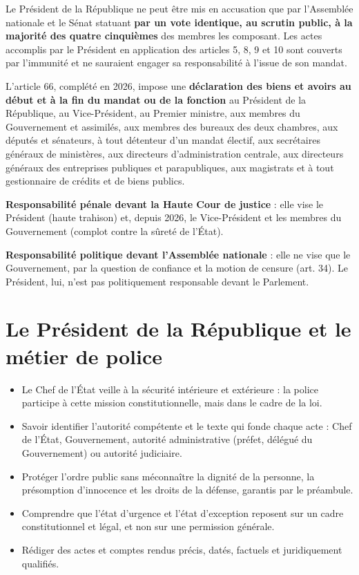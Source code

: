 \documentclass[11pt,a4paper,oneside]{report}
\begin{document}
Le Président de la République ne peut être mis en accusation que par l'Assemblée nationale et le Sénat statuant \textbf{par un vote identique, au scrutin public, à la majorité des quatre cinquièmes} des membres les composant. Les actes accomplis par le Président en application des articles 5, 8, 9 et 10 sont couverts par l'immunité et ne sauraient engager sa responsabilité à l'issue de son mandat.

L'article 66, complété en 2026, impose une \textbf{déclaration des biens et avoirs au début et à la fin du mandat ou de la fonction} au Président de la République, au Vice-Président, au Premier ministre, aux membres du Gouvernement et assimilés, aux membres des bureaux des deux chambres, aux députés et sénateurs, à tout détenteur d'un mandat électif, aux secrétaires généraux de ministères, aux directeurs d'administration centrale, aux directeurs généraux des entreprises publiques et parapubliques, aux magistrats et à tout gestionnaire de crédits et de biens publics.

\begin{keybox}[title={À retenir — Deux responsabilités à distinguer}]
\textbf{Responsabilité pénale devant la Haute Cour de justice} : elle vise le Président (haute trahison) et, depuis 2026, le Vice-Président et les membres du Gouvernement (complot contre la sûreté de l'État).

\textbf{Responsabilité politique devant l'Assemblée nationale} : elle ne vise que le Gouvernement, par la question de confiance et la motion de censure (art. 34). Le Président, lui, n'est pas politiquement responsable devant le Parlement.
\end{keybox}
\section{Le Président de la République et le métier de police}
\begin{itemize}
  \item Le Chef de l'État veille à la sécurité intérieure et extérieure : la police participe à cette mission constitutionnelle, mais dans le cadre de la loi.
  \item Savoir identifier l'autorité compétente et le texte qui fonde chaque acte : Chef de l'État, Gouvernement, autorité administrative (préfet, délégué du Gouvernement) ou autorité judiciaire.
  \item Protéger l'ordre public sans méconnaître la dignité de la personne, la présomption d'innocence et les droits de la défense, garantis par le préambule.
  \item Comprendre que l'état d'urgence et l'état d'exception reposent sur un cadre constitutionnel et légal, et non sur une permission générale.
  \item Rédiger des actes et comptes rendus précis, datés, factuels et juridiquement qualifiés.
\end{itemize}
\end{document}
